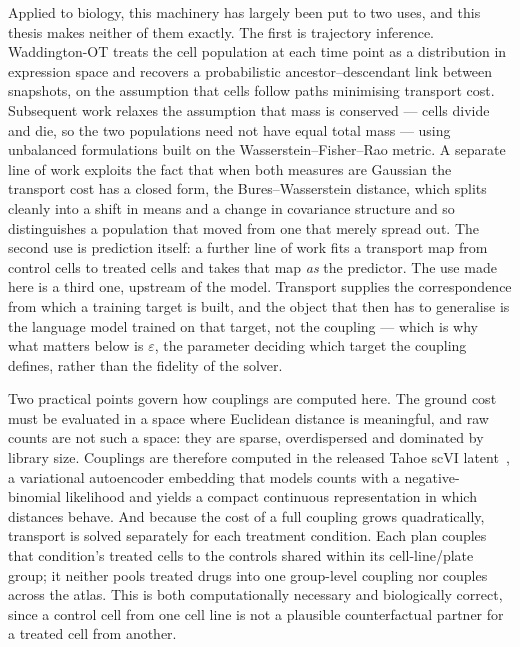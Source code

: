 Applied to biology, this machinery has largely been put to two uses, and this thesis makes neither of
them exactly. The first is trajectory inference. Waddington-OT
\cite{schiebinger} treats the cell population at each time point as a distribution in expression
space and recovers a probabilistic ancestor--descendant link between snapshots, on the assumption
that cells follow paths minimising transport cost. Subsequent work relaxes the assumption that mass
is conserved --- cells divide and die, so the two populations need not have equal total mass --- using
unbalanced formulations built on the Wasserstein--Fisher--Rao metric. A separate line of work
exploits the fact that when both measures are Gaussian the transport cost has a closed form, the
Bures--Wasserstein distance, which splits cleanly into a shift in means and a change in covariance
structure and so distinguishes a population that moved from one that merely spread out. The second
use is prediction itself: a further line of work fits a transport map from control cells to treated
cells and takes that map \emph{as} the predictor. The use made here is a third one, upstream of the
model. Transport supplies the correspondence from which a training target is built, and the object
that then has to generalise is the language model trained on that target, not the coupling --- which
is why what matters below is $\varepsilon$, the parameter deciding which target the coupling defines,
rather than the fidelity of the solver.

Two practical points govern how couplings are computed here. The ground cost must be evaluated in a
space where Euclidean distance is meaningful, and raw counts are not such a space: they are sparse,
overdispersed and dominated by library size. Couplings are therefore computed in the released Tahoe
scVI latent~\cite{scvi}, a variational autoencoder embedding that models counts with a
negative-binomial likelihood and yields a compact continuous representation in which distances
behave. And because the cost of a full coupling grows quadratically, transport is solved separately
for each treatment condition. Each plan couples that condition's treated cells to the controls
shared within its cell-line/plate group; it neither pools treated drugs into one group-level coupling
nor couples across the atlas. This is both computationally necessary and biologically correct, since
a control cell from one cell line is not a plausible counterfactual partner for a treated cell from
another.
